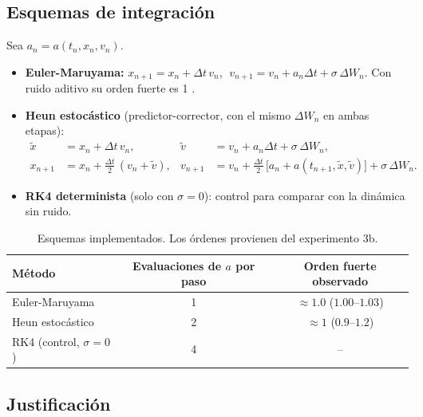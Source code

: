 \documentclass[12pt,a4paper]{article}
\begin{document}
\subsection{Esquemas de integración}

Sea $a_n=a(t_n,x_n,v_n)$.

\begin{itemize}
    \item \textbf{Euler-Maruyama:} $x_{n+1}=x_n+\Delta t\,v_n$, $\;v_{n+1}=v_n+a_n\Delta t+\sigma\,\Delta W_n$. Con ruido aditivo su orden fuerte es 1 \cite{kloeden1992}.
    \item \textbf{Heun estocástico} (predictor-corrector, con el mismo $\Delta W_n$ en ambas etapas):
    \begin{align}
        \tilde x &= x_n+\Delta t\,v_n, &
        \tilde v &= v_n+a_n\Delta t+\sigma\,\Delta W_n,\\
        x_{n+1} &= x_n+\tfrac{\Delta t}{2}\,(v_n+\tilde v), &
        v_{n+1} &= v_n+\tfrac{\Delta t}{2}\,\big[a_n+a(t_{n+1},\tilde x,\tilde v)\big]+\sigma\,\Delta W_n.
    \end{align}
    \item \textbf{RK4 determinista} (solo con $\sigma=0$): control para comparar con la dinámica sin ruido.
\end{itemize}

\begin{table}[H]
\centering
\begin{tabular}{@{}lcc@{}}
\toprule
Método & Evaluaciones de $a$ por paso & Orden fuerte observado\\
\midrule
Euler-Maruyama & 1 & $\approx1.0$ ($1.00$--$1.03$)\\
Heun estocástico & 2 & $\approx1$ ($0.9$--$1.2$)\\
RK4 (control, $\sigma=0$) & 4 & --\\
\bottomrule
\end{tabular}
\caption{Esquemas implementados. Los órdenes provienen del experimento 3b.}
\end{table}

\subsection{Justificación}
\end{document}
